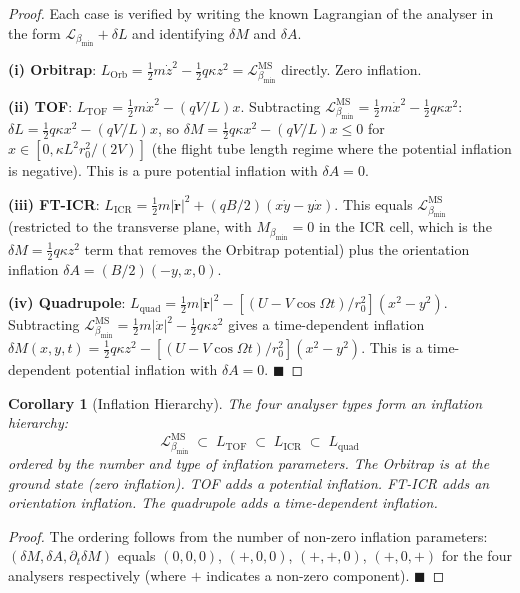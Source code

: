 \documentclass[11pt,twocolumn,a4paper]{article}
\theoremstyle{plain}
\newtheorem{corollary}[theorem]{Corollary}
\theoremstyle{definition}
\theoremstyle{remark}
\newcommand{\bmin}{\beta_{\min}}
\newcommand{\Lmin}{\mathcal{L}_{\bmin}}
\newcommand{\half}{\tfrac{1}{2}}
\renewcommand{\qed}{\hfill$\blacksquare$}
\begin{document}
\begin{proof}
Each case is verified by writing the known Lagrangian of the analyser in the
form $\Lmin + \delta L$ and identifying $\delta M$ and $\delta A$.

\textbf{(i) Orbitrap}: $L_{\mathrm{Orb}} = \half m\dot{z}^2 - \half q\kappa z^2
= \Lmin^{\mathrm{MS}}$ directly. Zero inflation.

\textbf{(ii) TOF}: $L_{\mathrm{TOF}} = \half m\dot{x}^2 - (qV/L)x$.
Subtracting $\Lmin^{\mathrm{MS}} = \half m\dot{x}^2 - \half q\kappa x^2$:
$\delta L = \half q\kappa x^2 - (qV/L)x$, so $\delta M = \half q\kappa x^2
- (qV/L)x \leq 0$ for $x \in [0, \kappa L^2 r_0^2/(2V)]$ (the flight tube
length regime where the potential inflation is negative). This is a pure
potential inflation with $\delta A = 0$.

\textbf{(iii) FT-ICR}: $L_{\mathrm{ICR}} = \half m|\dot{\mathbf{r}}|^2 +
(qB/2)(x\dot{y} - y\dot{x})$. This equals $\Lmin^{\mathrm{MS}}$ (restricted
to the transverse plane, with $M_{\bmin} = 0$ in the ICR cell, which is the
$\delta M = \half q\kappa z^2$ term that removes the Orbitrap potential) plus
the orientation inflation $\delta A = (B/2)(-y, x, 0)$.

\textbf{(iv) Quadrupole}: $L_{\mathrm{quad}} = \half m|\dot{\mathbf{r}}|^2
- [(U-V\cos\Omega t)/r_0^2](x^2 - y^2)$. Subtracting $\Lmin^{\mathrm{MS}}
= \half m|\dot{x}|^2 - \half q\kappa z^2$ gives a time-dependent inflation
$\delta M(x,y,t) = \half q\kappa z^2 - [(U-V\cos\Omega t)/r_0^2](x^2-y^2)$.
This is a time-dependent potential inflation with $\delta A = 0$. \qed
\end{proof}

\begin{corollary}[Inflation Hierarchy]
\label{cor:hierarchy}
The four analyser types form an inflation hierarchy:
\[
  \Lmin^{\mathrm{MS}} \;\subset\; L_{\mathrm{TOF}} \;\subset\; L_{\mathrm{ICR}}
  \;\subset\; L_{\mathrm{quad}}
\]
ordered by the number and type of inflation parameters. The Orbitrap is at the
ground state (zero inflation). TOF adds a potential inflation. FT-ICR adds an
orientation inflation. The quadrupole adds a time-dependent inflation.
\end{corollary}

\begin{proof}
The ordering follows from the number of non-zero inflation parameters:
$(\delta M, \delta A, \partial_t \delta M)$ equals $(0,0,0)$, $(+,0,0)$,
$(+,+,0)$, $(+,0,+)$ for the four analysers respectively (where $+$ indicates
a non-zero component). \qed
\end{proof}
\end{document}
